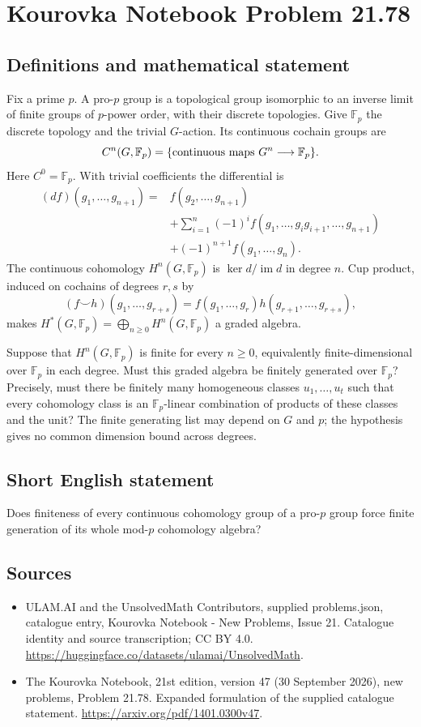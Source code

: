 \documentclass[11pt,a4paper]{article}
\begin{document}
\section*{Kourovka Notebook Problem 21.78}\label{statement}

\subsection{Definitions and mathematical statement}
Fix a prime $p$. A pro-$p$ group is a topological group isomorphic to an inverse limit of finite groups of $p$-power order, with their discrete topologies. Give $\mathbb F_p$ the discrete topology and the trivial $G$-action. Its continuous cochain groups are
\[
 C^n(G,\mathbb F_p)=\{\hbox{continuous maps }G^n\longrightarrow\mathbb F_p\}.
\]
Here $C^0=\mathbb F_p$. With trivial coefficients the differential is
\[
\begin{split}
(df)(g_1,\ldots,g_{n+1})={}&f(g_2,\ldots,g_{n+1})\\
&+\sum_{i=1}^n(-1)^if(g_1,\ldots,g_ig_{i+1},\ldots,g_{n+1})\\
&+(-1)^{n+1}f(g_1,\ldots,g_n).
\end{split}
\]
The continuous cohomology $H^n(G,\mathbb F_p)$ is $\ker d/\operatorname{im}d$ in degree $n$. Cup product, induced on cochains of degrees $r,s$ by
\[
 (f\smile h)(g_1,\ldots,g_{r+s})
 =f(g_1,\ldots,g_r)h(g_{r+1},\ldots,g_{r+s}),
\]
makes $H^*(G,\mathbb F_p)=\bigoplus_{n\ge0}H^n(G,\mathbb F_p)$ a graded algebra.

Suppose that $H^n(G,\mathbb F_p)$ is finite for every $n\ge0$, equivalently finite-dimensional over $\mathbb F_p$ in each degree. Must this graded algebra be finitely generated over $\mathbb F_p$? Precisely, must there be finitely many homogeneous classes $u_1,\ldots,u_t$ such that every cohomology class is an $\mathbb F_p$-linear combination of products of these classes and the unit? The finite generating list may depend on $G$ and $p$; the hypothesis gives no common dimension bound across degrees.
\subsection{Short English statement}
Does finiteness of every continuous cohomology group of a pro-$p$ group force finite generation of its whole mod-$p$ cohomology algebra?
\subsection{Sources}
\begin{itemize}
\item[S1] ULAM.AI and the UnsolvedMath Contributors, supplied problems.json, catalogue entry, Kourovka Notebook - New Problems, Issue 21. Catalogue identity and source transcription; CC BY 4.0.
\url{https://huggingface.co/datasets/ulamai/UnsolvedMath}.
\item[S2] The Kourovka Notebook, 21st edition, version 47 (30 September 2026), new problems, Problem 21.78. Expanded formulation of the supplied catalogue statement.
\url{https://arxiv.org/pdf/1401.0300v47}.
\end{itemize}
\end{document}
